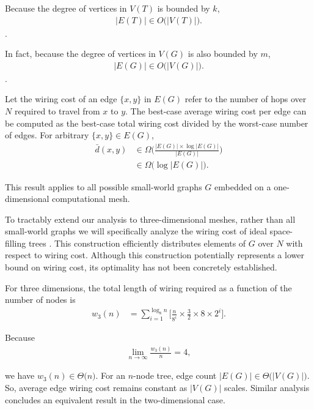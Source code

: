 Because the degree of vertices in $V(T)$ is bounded by $k$,
\begin{align*}
|E(T)| \in O \Big( |V(T)| \Big).
\end{align*}.

In fact, because the degree of vertices in $V(G)$ is also bounded by $m$,
\begin{align*}
|E(G)| \in O \Big( |V(G)| \Big).
\end{align*}.

Let the wiring cost of an edge $\{x, y\}$ in $E(G)$ refer to the number of hops over $N$ required to travel from $x$ to $y$.
The best-case average wiring cost per edge can be computed as the best-case total wiring cost divided by the worst-case number of edges.
For arbitrary $\{x, y\} \in E(G)$,
\begin{align*}
\bar{d}(x, y)
&\in \Omega \Big( \frac{ |E(G)| \times \log |E(G)| }{ |E(G)| } \Big)\\
&\in \Omega \Big( \log |E(G)| \Big).
\end{align*}

This result applies to all possible small-world graphs $G$ embedded on a one-dimensional computational mesh.

To tractably extend our analysis to three-dimensional meshes, rather than all small-world graphs we will specifically analyze the wiring cost of ideal space-filling trees .
This construction efficiently distributes elements of $G$ over $N$ with respect to wiring cost.
Although this construction potentially represents a lower bound on wiring cost, its optimality has not been concretely established.

For three dimensions, the total length of wiring required as a function of the number of nodes is
\begin{align*}
w_3(n)
&=
\sum_{i=1}^{\log_8 n} \Big[
  \frac{n}{8^i} %
  \times
  \frac{3}{2} \times 8 \times 2^{i} %
\Big].
\end{align*}

Because
\begin{align*}
\lim_{n \rightarrow \infty}
\frac{w_3(n)}{n} = 4,
\end{align*}

we have $w_3(n) \in \Theta \Big( n \Big)$.
For an $n$-node tree, edge count $|E(G)| \in \Theta \Big( |V(G)| \Big)$.
So, average edge wiring cost remains constant as $|V(G)|$ scales.
Similar analysis concludes an equivalent result in the two-dimensional case.

